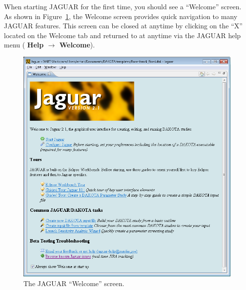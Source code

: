 When starting JAGUAR for the first time, you should see a ``Welcome''
screen.  As shown in Figure~\ref{fig:input:jag_welcome}, the Welcome
screen provides quick navigation to many JAGUAR features.  This screen
can be closed at anytime by clicking on the ``X'' located on the
Welcome tab and returned to at anytime via the JAGUAR help menu ({\bf
  Help $\rightarrow$ Welcome}).
\begin{figure}
  \centering
  \includegraphics[scale=0.4]{images/2_1jag_welcome}
  \caption{The JAGUAR ``Welcome'' screen.}
  \label{fig:input:jag_welcome}
\end{figure}

